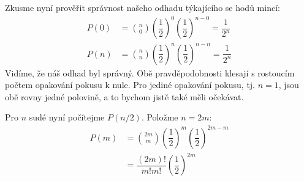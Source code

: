      Zkusme nyní prověřit správnost našeho odhadu týkajícího se hodů mincí:
      \begin{align*}
        P(0) &= \binom{n}{0}
                \left(\dfrac{1}{2}\right)^0\left(\dfrac{1}{2}\right)^{n-0} 
              = \dfrac{1}{2^n}                                                 \\
        P(n) &= \binom{n}{n} 
                \left(\dfrac{1}{2}\right)^n\left(\dfrac{1}{2}\right)^{n-n} 
              = \dfrac{1}{2^n}     
      \end{align*}
      Vidíme, že náš odhad byl správný. Obě pravděpodobnosti klesají s rostoucím počtem opakování
      pokusu k nule.  Pro jediné opakování pokusu, tj. \(n = 1\), jsou obě rovny jedné polovině, a
      to bychom jistě také měli očekávat. 
      
      Pro \(n\) sudé nyní počítejme \(P(n/2)\). Položme \(n = 2m\):
      \begin{align*}
        P(m) &= \binom{2m}{m}
                \left(\dfrac{1}{2}\right)^m\left(\dfrac{1}{2}\right)^{2m-m}                       \\
             &= \dfrac{(2m)!}{m!m!}\left(\dfrac{1}{2}\right)^{2m}     
      \end{align*}
  
      {\centering
      \par}
     
